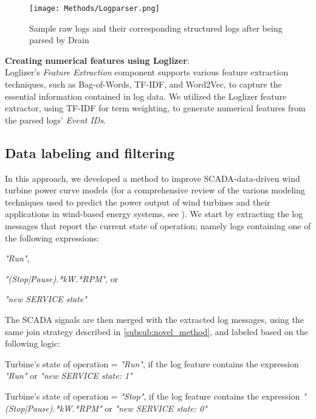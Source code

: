     \begin{figure}[!htbp]
      \begin{center}
        \texttt{[image: Methods/Logparser.png]}
      \end{center}
      \caption{Sample raw logs and their corresponding structured logs after being parsed by Drain}
      \label{fig:logparser}
    \end{figure}

    \begin{flushleft}
      \textbf{Creating numerical features using Loglizer}:\\
      Loglizer's \emph{Feature Extraction} component supports various feature extraction techniques, such as Bag-of-Words, TF-IDF, and Word2Vec, 
      to capture the essential information contained in log data. We utilized the Loglizer feature extractor, using TF-IDF \cite{TF-IDF} for term weighting, to generate numerical 
      features from the parsed logs' \emph{Event IDs}. 
    \end{flushleft}

\subsection{Data labeling and filtering}
  In this approach, we developed a method to improve SCADA-data-driven wind turbine power curve models 
  (for a comprehensive review of the various modeling techniques used to predict the power output of wind turbines and their applications in wind-based energy systems, 
  see \cite{Power_curves}). We start by extracting the log messages that report the current state of operation; namely logs containing one of the following expressions:
  \begin{bulletList}
    \item \emph{"Run"},
    \item \emph{"(Stop|Pause).*kW.*RPM"}, or
    \item \emph{"new SERVICE state"}
  \end{bulletList}
  The SCADA signals are then merged with the extracted log messages, using the same join strategy described in \ref{subsub:novel_method}, and labeled based on the following logic:
  \begin{bulletList}
    \item Turbine's state of operation = \emph{"Run"}, if the log feature contains the expression \emph{"Run"} or \emph{"new SERVICE state: 1"}
    \item Turbine's state of operation = \emph{"Stop"}, if the log feature contains the expression \emph{"(Stop|Pause).*kW.*RPM"} or \emph{"new SERVICE state: 0"}
  \end{bulletList}

